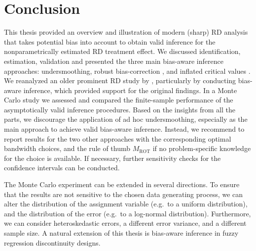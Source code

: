 


\section{Conclusion} \label{sec:conclusion}

This thesis provided an overview and illustration of modern (sharp) RD analysis
that takes potential bias into account to obtain valid inference for
the nonparametrically estimated RD treatment effect.
We discussed identification, estimation, validation and
presented the three main bias-aware inference approaches:
undersmoothing, robust bias-correction \parencite{Calonico_2014}, and inflated critical values \parencite{Armstrong_2020}.
We reanalyzed an older prominent RD study by \textcite{Ludwig_2007},
particularly by conducting bias-aware inference,
which provided support for the original findings.
In a Monte Carlo study we assessed and compared the finite-sample performance of the asymptotically valid inference procedures.
Based on the insights from all the parts, we discourage the application of ad hoc undersmoothing,
especially as the main approach to achieve valid bias-aware inference.
Instead, we recommend to report results for the two other approaches with the corresponding optimal bandwidth choices,
and the rule of thumb $M_{\text{ROT}}$ if no problem-specific knowledge for the choice is available.
If necessary, further sensitivity checks for the confidence intervals can be conducted.

The Monte Carlo experiment can be extended in several directions.
To ensure that the results are not sensitive to the chosen data generating process,
we can alter the distribution of the assignment variable (e.g.\ to a uniform distribution),
and the distribution of the error (e.g.\ to a log-normal distribution).
Furthermore, we can consider heteroskedastic errors, a different error variance, and a different sample size.
A natural extension of this thesis is bias-aware inference in fuzzy regression discontinuity designs.